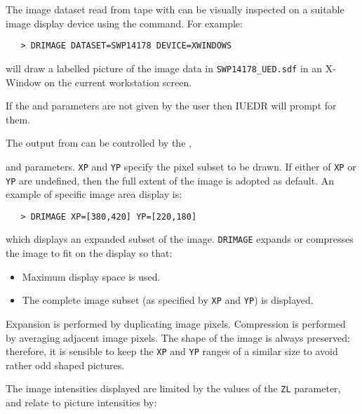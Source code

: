 The image dataset read from tape with 
can be visually inspected on a suitable image display device using the
 command.  For example:

\begin{verbatim}
   > DRIMAGE DATASET=SWP14178 DEVICE=XWINDOWS
\end{verbatim}

will draw a labelled picture of the image data in \verb+SWP14178_UED.sdf+ in
an X-Window on the current workstation screen.

If the 
 and 
 parameters are not given by the user
then IUEDR will prompt for them.

The output from 
 can be controlled by the , 

and 
 parameters.  \verb+XP+ and \verb+YP+ specify the pixel subset to
be drawn.  If either of \verb+XP+ or \verb+YP+ are undefined, then the full
extent of the image is adopted as default.  An example of specific image area
display is:

\begin{verbatim}
   > DRIMAGE XP=[380,420] YP=[220,180]
\end{verbatim}

which displays an expanded subset of the image.  \verb+DRIMAGE+ expands or
compresses the image to fit on the display so that:

\begin{itemize}

\item Maximum display space is used.

\item The complete image subset (as specified by \verb+XP+ and \verb+YP+) is
      displayed.

\end{itemize}

Expansion is performed by duplicating image pixels.  Compression is
performed by averaging adjacent image pixels.  The shape of the image
is always preserved; therefore, it is sensible to keep the \verb+XP+ and
\verb+YP+ ranges of a similar size to avoid rather odd shaped pictures.

The image intensities displayed are limited by the values of the \verb+ZL+
parameter, and relate to picture intensities by:


